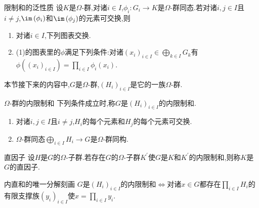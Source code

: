 \begin{proposition}{限制和的泛性质}{}
	设$K$是$\Omega$-群,对诸$i\in I$,$\phi_{i}:G_{i}\to K$是$\Omega$-群同态.若对诸$i,j\in I$且$i\neq j$,$\im\left(\phi_{i}\right)$和$\im\left(\phi_{j}\right)$的元素可交换,则
	\begin{enumerate}
		\item 对诸$i\in I$,下列图表交换.
		\begin{center}
		\end{center}
		\item (1)的图表里的$\phi$满足下列条件:对诸$\left(x_{i}\right)_{i\in I}\in\bigoplus\limits_{k\in I}G_{k}$有$\phi\left(\left(x_{i}\right)_{i\in I}\right)=\prod\limits_{i\in I}\phi_{i}\left(x_{i}\right)$.
	\end{enumerate}
\end{proposition}

本节接下来的内容中,$G$是$\Omega$-群,$\left(H_{i}\right)_{i\in I}$是它的一族$\Omega$-群.

\begin{definition}{$\Omega$-群的内限制和}{}
	下列条件成立时,称$G$是$\left(H_{i}\right)_{i\in I}$的内限制和.
	\begin{enumerate}
		\item 对诸$i,j\in I$且$i\neq j$,$H_{i}$的每个元素和$H_{j}$的每个元素可交换.
		\item $\Omega$-群同态$\bigoplus\limits_{i\in I}H_{i}\to G$是$\Omega$-群同构.
	\end{enumerate}
\end{definition}

\begin{definition}{直因子}{}
	设$H$是$G$的$\Omega$-子群.若存在$G$的$\Omega$-子群$K^{\prime}$使$G$是$K$和$K^{\prime}$的内限制和,则称$K$是$G$的直因子.
\end{definition}

\begin{proposition}{内直和的唯一分解刻画}{}
	$G$是$\left(H_{i}\right)_{i\in I}$的内限制和$\iff$对诸$x\in G$都存在$\prod\limits_{i\in I}H_{i}$的有限支撑族$\left(y_{i}\right)_{i\in I}$使$x=\prod\limits_{i\in I}y_{i}$.
\end{proposition}

